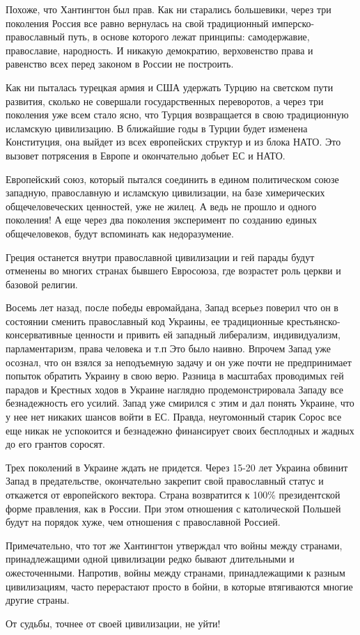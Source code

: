 Похоже, что Хантингтон был прав.  Как ни старались большевики, через три
поколения Россия все равно вернулась на свой традиционный имперско-
православный путь, в основе которого лежат принципы: самодержавие, православие,
народность. И никакую демократию, верховенство права и равенство всех перед
законом в России не построить.  

Как ни пыталась турецкая армия и США удержать Турцию на светском пути развития,
сколько не совершали государственных переворотов, а через три поколения уже
всем стало ясно, что Турция возвращается в свою традиционную исламскую
цивилизацию. В ближайшие годы в Турции будет изменена Конституция, она выйдет
из всех европейских структур и из блока НАТО. Это вызовет потрясения в Европе и
окончательно добьет ЕС и НАТО.  

Европейский союз, который пытался соединить в едином политическом союзе
западную, православную и исламскую цивилизации, на базе химерических
общечеловеческих ценностей, уже не жилец. А ведь не  прошло и одного
поколения! А еще через два поколения эксперимент по созданию единых
общечеловеков, будут вспоминать как недоразумение. 

Греция останется внутри православной цивилизации и гей парады будут отменены во
многих странах бывшего Евросоюза, где возрастет роль церкви и базовой религии.  

Восемь  лет   назад, после победы евромайдана,  Запад всерьез поверил что он в
состоянии сменить православный код Украины, ее традиционные
крестьянско-консервативные ценности  и привить ей западный либерализм,
индивидуализм, парламентаризм, права человека  и т.п  Это было наивно. Впрочем
Запад уже осознал,  что он взялся за неподъемную задачу и он уже почти не
предпринимает попыток обратить Украину в свою верю. Разница в масштабах
проводимых гей парадов и Крестных ходов в Украине наглядно продемонстрировала
Западу все безнадежность его усилий.  Запад уже смирился с этим и дал понять
Украине, что у нее нет никаких шансов войти в ЕС. Правда, неугомонный старик
Сорос все еще никак не успокоится и безнадежно финансирует  своих бесплодных и
жадных до его грантов соросят. 

Трех поколений  в Украине ждать не придется. Через 15-20  лет Украина  обвинит
Запад в предательстве, окончательно закрепит свой православный статус и
откажется от европейского вектора.   Страна возвратится к 100\% президентской
форме правления, как в  России. При этом отношения с католической Польшей
будут на порядок хуже, чем отношения с православной Россией. 

Примечательно, что тот же Хантингтон утверждал что войны между странами,
принадлежащими одной цивилизации редко бывают длительными и ожесточенными.
Напротив, войны между странами, принадлежащими  к разным цивилизациям, часто
перерастают просто в бойни, в которые втягиваются многие другие страны. 

От судьбы, точнее от своей цивилизации, не уйти!
